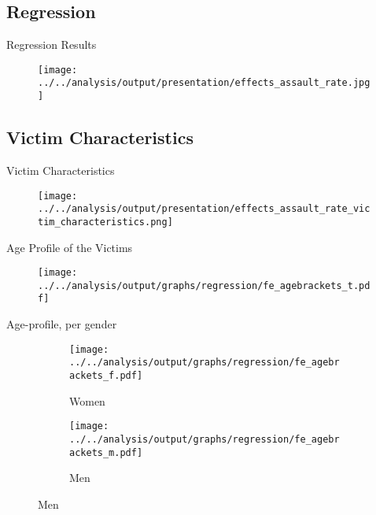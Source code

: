 \documentclass[usenames,dvipsnames]{beamer} %
\begin{document}
	\subsection{Regression}
	\begin{frame}{Regression Results}
		\begin{figure}
			\texttt{[image: ../../analysis/output/presentation/effects\_assault\_rate.jpg]}
		\end{figure}
	\end{frame}


	\subsection{Victim Characteristics}
	\begin{frame}{Victim Characteristics}
		\begin{figure}
			\texttt{[image: ../../analysis/output/presentation/effects\_assault\_rate\_victim\_characteristics.png]}
		\end{figure}
	\end{frame}

	\begin{frame}{Age Profile of the Victims}
		\begin{figure}[H]\centering
			\texttt{[image: ../../analysis/output/graphs/regression/fe\_agebrackets\_t.pdf]}
		\end{figure}
	\end{frame}

	\begin{frame}{Age-profile, per gender}
		\begin{figure}
				\begin{subfigure}[h]{0.48\linewidth}\centering\caption{Women}
				\texttt{[image: ../../analysis/output/graphs/regression/fe\_agebrackets\_f.pdf]}
			\end{subfigure}
			\begin{subfigure}[h]{0.48\linewidth}\centering\caption{Men}
				\texttt{[image: ../../analysis/output/graphs/regression/fe\_agebrackets\_m.pdf]}
			\end{subfigure}
		\end{figure}
	\end{frame}
\end{document}
